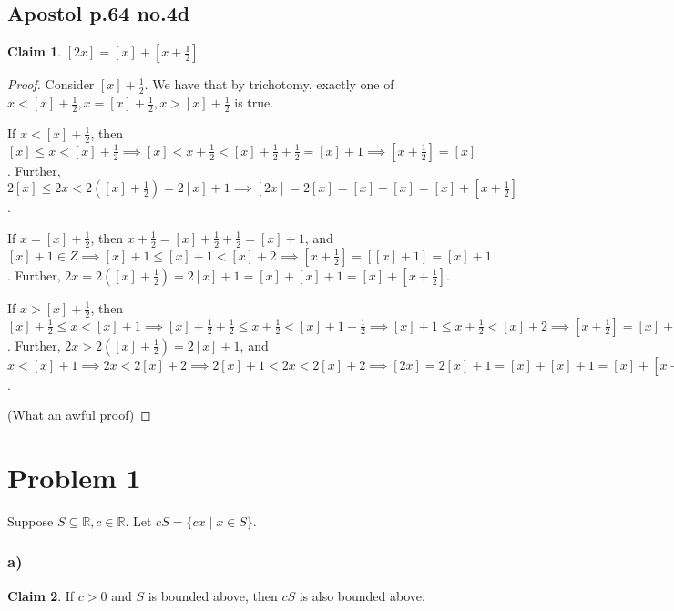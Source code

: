 \documentclass[12pt,letterpaper]{article}
\theoremstyle{definition}
\newtheorem*{claim}{Claim}
\newcommand{\R}{\mathbb{R}}
\begin{document}
\subsection*{Apostol p.64 no.4d}

\begin{claim}
  $[2x] = [x] + [x + \frac{1}{2}]$
\end{claim}

\begin{proof}
  Consider $[x] + \frac{1}{2}$. We have that by trichotomy, exactly one of
  $x < [x]+\frac{1}{2}, x = [x]+\frac{1}{2}, x > [x]+\frac{1}{2}$ is true.

  If $x < [x]+\frac{1}{2}$, then $[x] \leq x < [x] + \frac{1}{2} \implies [x]
  < x + \frac{1}{2} < [x] + \frac{1}{2} + \frac{1}{2} = [x] + 1 \implies [x +
  \frac{1}{2}] = [x]$. Further, $2[x] \leq 2x < 2([x] + \frac{1}{2}) = 2[x] + 1 \implies [2x]
  = 2[x] = [x] + [x] = [x] + [x + \frac{1}{2}]$.

  If $x = [x]+\frac{1}{2}$, then $x + \frac{1}{2} = [x] + \frac{1}{2} + \frac{1}{2} = [x] +
  1$, and $[x] + 1 \in Z \implies [x] + 1 \leq [x] + 1 < [x] + 2 \implies [x +
  \frac{1}{2}] = [[x] + 1] = [x] + 1$. Further, $2x = 2([x] + \frac{1}{2}) = 2[x]
  + 1 = [x] + [x] + 1 = [x] + [x + \frac{1}{2}]$.

  If $x > [x]+\frac{1}{2}$, then $[x] + \frac{1}{2} \leq x < [x] + 1 \implies [x] +
  \frac{1}{2} + \frac{1}{2} \leq x + \frac{1}{2} < [x] + 1 + \frac{1}{2}
  \implies [x] + 1 \leq x + \frac{1}{2} < [x] + 2 \implies [x + \frac{1}{2}] =
  [x] + 1$. Further, $2x > 2([x] + \frac{1}{2}) = 2[x] + 1$, and $x < [x] + 1
  \implies 2x < 2[x] + 2 \implies 2[x] + 1 < 2x < 2[x] + 2 \implies [2x] = 2[x]
  + 1 = [x] + [x] + 1 = [x] + [x + \frac{1}{2}]$.

  (What an awful proof)
\end{proof}

\section*{Problem 1}

Suppose $S \subseteq \R, c \in \R$. Let $cS = \{cx \mid x \in S\}$.

\subsubsection*{a)}

\begin{claim}
  If $c > 0$ and $S$ is bounded above, then $cS$ is also bounded above.
\end{claim}
\end{document}

